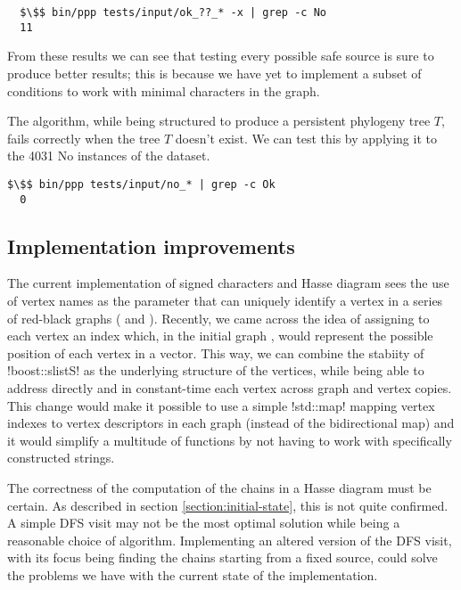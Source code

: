 \begin{lstlisting}
  $\$$ bin/ppp tests/input/ok_??_* -x | grep -c No
  11
\end{lstlisting}

From these results we can see that testing every possible safe source is sure to produce better results; this is because we have yet to implement a subset of conditions to work with minimal characters in the graph.

The algorithm, while being structured to produce a persistent phylogeny tree $T$, fails correctly when the tree $T$ doesn't exist.
We can test this by applying it to the 4031 No instances of the dataset.

\begin{lstlisting}[belowskip=0pt]
  $\$$ bin/ppp tests/input/no_* | grep -c Ok
  0
\end{lstlisting}

\subsection{Implementation improvements}\label{section:impl-improvements}

The current implementation of signed characters and Hasse diagram sees the use of vertex names as the parameter that can uniquely identify a vertex in a series of red-black graphs (\grb{} and \gm{}).
Recently, we came across the idea of assigning to each vertex an index which, in the initial graph \grb{}, would represent the possible position of each vertex in a vector.
This way, we can combine the stabiity of !boost::slistS! as the underlying structure of the vertices, while being able to address directly and in constant-time each vertex across graph and vertex copies.
This change would make it possible to use a simple !std::map! mapping vertex indexes to vertex descriptors in each graph (instead of the bidirectional map) and it would simplify a multitude of functions by not having to work with specifically constructed strings.

The correctness of the computation of the chains in a Hasse diagram must be certain.
As described in section \ref{section:initial-state}, this is not quite confirmed.
A simple DFS visit may not be the most optimal solution \textendash{} while being a reasonable choice of algorithm.
Implementing an altered version of the DFS visit, with its focus being finding the chains starting from a fixed source, could solve the problems we have with the current state of the implementation.

